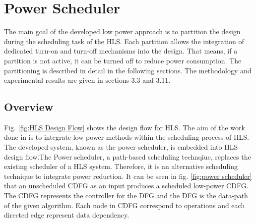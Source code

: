\documentclass[conference]{IEEEtran}
\begin{document}




\section{Power Scheduler}\label{AA}
\label{sec: power scheduler}
The main goal of the developed low power approach is to partition the design during the scheduling task of the HLS. Each partition allows the integration of dedicated turn-on and turn-off mechanisms into the design. That means, if a partition is not active, it can be turned off to reduce power consumption. The partitioning is described in detail in the following sections. The methodology and experimental results are given in sections 3.3 and 3.11.
\subsection{Overview}
Fig. \ref{fig:HLS Design Flow} shows the design flow for HLS. The aim of the work done in \cite{Ret} is to integrate low power methods within the scheduling process of HLS. The developed system, known as the power scheduler, is embedded into HLS design flow.The Power scheduler, a path-based scheduling technqiue, replaces the existing scheduler of a HLS system. Therefore, it is an alternative scheduling technique to integrate power reduction. It can be seen in fig. \ref{fig:power scheduler} that an unscheduled CDFG as an input produces a scheduled low-power CDFG. The CDFG represents the controller for the DFG and the DFG is the data-path of the given algorithm. Each node in CDFG correspond to operations and each directed edge represent data dependency. 
\end{document}
